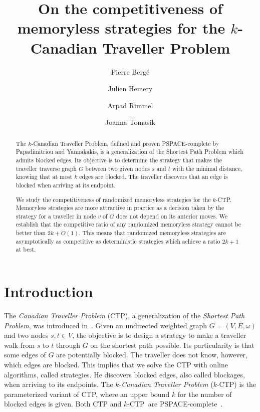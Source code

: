 \documentclass[preprint]{elsarticle}
\newcommand{\kctp}{$k$-CTP}
\begin{document}
\title{On the competitiveness of memoryless strategies for the $k$-Canadian Traveller Problem}
\author[upsud]{Pierre Berg\'e }
\author[cs]{Julien Hemery}
\author[cs]{Arpad Rimmel}
\author[cs]{Joanna Tomasik}
\address[upsud]{LRI, Universit\'e Paris-Sud, Universit\'e Paris-Saclay, 91405 Orsay Cedex, France}
\address[cs]{LRI, CentraleSup\' elec, Universit\'e Paris-Saclay, 91405 Orsay Cedex, France}

\begin{abstract}
The $k$-Canadian Traveller Problem, defined and proven PSPACE-complete by Papadimitriou and Yannakakis, is a generalization of the Shortest Path Problem which admits blocked edges. Its objective is to determine the strategy that makes the traveller traverse graph $G$ between two given nodes $s$ and $t$ with the minimal distance, knowing that at most $k$ edges are blocked. The traveller discovers that an edge is blocked when arriving at its endpoint. 
 
We study the competitiveness of randomized memoryless strategies for the \kctp . Memoryless strategies are more attractive in practice as a decision taken by the strategy for a traveller in node $v$ of $G$ does not depend on its anterior moves. We establish that the competitive ratio of any randomized memoryless strategy cannot be better than $2k + O\left(1\right)$. This means that randomized memoryless strategies are asymptotically as competitive as deterministic strategies which achieve a ratio $2k+1$ at best.
\end{abstract}

\maketitle


\section{Introduction}

The \textit{Canadian Traveller Problem} (CTP), a generalization of the \textit{Shortest Path Problem}, was introduced in~\cite{PaYa91}. Given an undirected weighted graph $G=(V,E,\omega)$ and two nodes $s,t \in V$, the objective is to design a strategy to make a traveller walk from $s$ to $t$ through $G$ on the shortest path possible. Its particularity is that some edges of $G$ are potentially blocked. The traveller does not know, however, which edges are blocked. This implies that we solve the CTP with online algorithms, called strategies. He discovers blocked edges, also called blockages, when arriving to its endpoints. The $k$-\textit{Canadian Traveller Problem} (\kctp) is the parameterized variant of CTP, where an upper bound $k$ for the number of blocked edges is given. Both CTP and \kctp ~are PSPACE-complete~\cite{BaSc91,PaYa91}.
\end{document}
